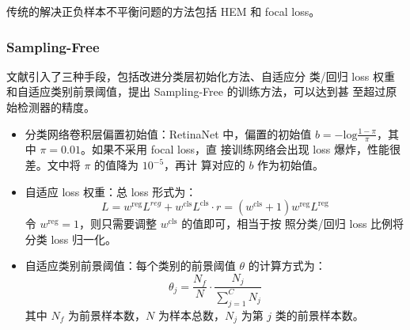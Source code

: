 传统的解决正负样本不平衡问题的方法包括 HEM 和 focal loss。

\subsubsection{Sampling-Free}
文献引入了三种手段，包括改进分类层初始化方法、自适应分
类/回归 loss 权重和自适应类别前景阈值，提出 Sampling-Free 的训练方法，可以达到甚
至超过原始检测器的精度。

\begin{itemize}
  \item 分类网络卷积层偏置初始值：RetinaNet 中，偏置的初始值 $b =
    -\mathrm{log}\frac{1-\pi}{\pi}$，其中 $\pi=0.01$。如果不采用 focal loss，直
    接训练网络会出现 loss 爆炸，性能很差。文中将 $\pi$ 的值降为 $10^{-5}$，再计
    算对应的 $b$ 作为初始值。
  \item 自适应 loss 权重：总 loss 形式为：
    \begin{equation}
    L = w^{\mathrm{reg}} L^{reg} +
    w^{\mathrm{cls}} L^{\mathrm{cls}} \cdot r = \left( w^{\mathrm{cls}} + 1
    \right) w^{\mathrm{reg}} L^{\mathrm{reg}}
    \end{equation}
    令 $w^{\mathrm{reg}} = 1$，则只需要调整 $w^{\mathrm{cls}}$ 的值即可，相当于按
    照分类/回归 loss 比例将分类 loss 归一化。
  \item 自适应类别前景阈值：每个类别的前景阈值 $\theta$ 的计算方式为：
    \begin{equation}
      \theta_j = \frac{N_f}{N} \cdot \frac{N_j}{\sum_{j=1}^{C} N_j}
    \end{equation}
    其中 $N_f$ 为前景样本数，$N$ 为样本总数，$N_j$ 为第 $j$ 类的前景样本数。
\end{itemize}


